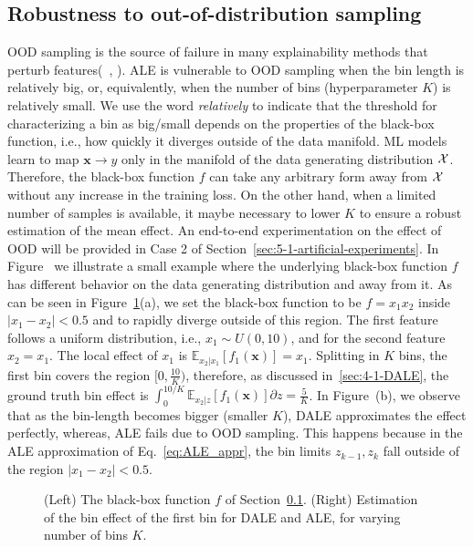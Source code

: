 \documentclass[wcp]{jmlr}
\newcommand{\xb}{\mathbf{x}} \newcommand{\R}{\mathbb{R}}
\newcommand{\E}{\mathbb{E}} \newcommand{\Jac}{\mathbf{J}}
\begin{document}
\subsection{Robustness to out-of-distribution sampling}
\label{sec:4-3-robustness} OOD sampling is the source of failure in many explainability methods that perturb features(~\cite{Baniecki2022}, \cite{Hooker2021}). ALE is vulnerable to OOD sampling when the bin length is relatively big, or, equivalently, when the number of bins (hyperparameter \(K\)) is relatively small. We use the word \textit{relatively} to indicate that the threshold for characterizing a bin as big/small depends on the properties of the black-box function, i.e., how quickly it diverges outside of the data manifold. ML models learn to map \( \xb \rightarrow y \) only in the manifold of the data generating distribution \(\mathcal{X}\). Therefore, the black-box function \(f\) can take any arbitrary form away from \(\mathcal{X}\) without any increase in the training loss. On the other hand, when a limited number of samples is available, it maybe necessary to lower \(K\) to ensure a robust estimation of the mean effect. An end-to-end experimentation on the effect of OOD will be provided in Case 2 of Section~\ref{sec:5-1-artificial-experiments}.
%
In Figure~ we illustrate a small example where the underlying black-box function \(f\) has different behavior on the data generating distribution and away from it. As can be seen in Figure~\ref{fig:example-different-bins}(a), we set the black-box function to be \(f = x_1x_2\) inside \(|x_1-x_2| < 0.5\) and to rapidly diverge outside of this region. The first feature follows a uniform distribution, i.e., \(x_1 \sim U(0,10)\), and for the second feature \(x_2=x_1\). The local effect of \(x_1\) is \(\E_{x_2|x_1} \left [ f_1(\xb) \right ] = x_1 \). Splitting in \(K\) bins, the first bin covers the region \( [0, \frac{10}{K} ) \), therefore, as discussed in~\ref{sec:4-1-DALE}, the ground truth bin effect is \(\int_0^{10/K} \E_{x_2|z}\left[f_1(\xb)\right]\partial z = \frac{5}{K}\). In Figure~(b), we observe that as the bin-length becomes bigger (smaller \(K\)), DALE approximates the effect perfectly, whereas, ALE fails due to OOD sampling. This happens because in the ALE approximation of Eq.~\eqref{eq:ALE_appr}, the bin limits \(z_{k-1}, z_k\) fall outside of the region \(|x_1-x_2| < 0.5\).

\begin{figure}[h] \centering \resizebox{.35\columnwidth}{!}{} \resizebox{.35\columnwidth}{!}{}
  \caption[Example comparison]{(Left) The black-box function \(f\) of Section~\ref{sec:4-3-robustness}. (Right) Estimation of the bin effect of the first bin for DALE and ALE, for varying number of bins \(K\).}
  \label{fig:example-different-bins}
\end{figure}
\end{document}
